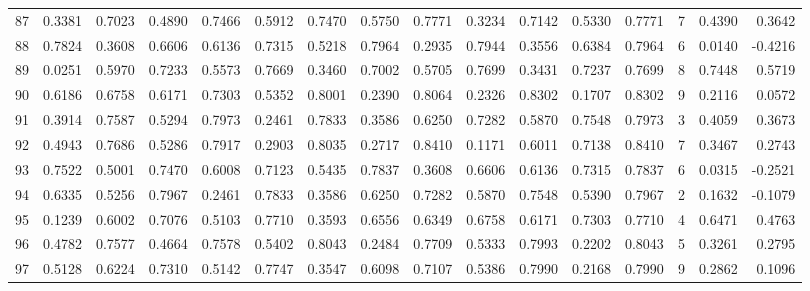 \begin{tabular}{lrrrrrrrrrrrrrrr}
87  &      0.3381 &  0.7023 &  0.4890 &  0.7466 &  0.5912 &  0.7470 &  0.5750 &  0.7771 &  0.3234 &  0.7142 &   0.5330 &     0.7771 &      7 &                    0.4390 &                     0.3642 \\
88  &      0.7824 &  0.3608 &  0.6606 &  0.6136 &  0.7315 &  0.5218 &  0.7964 &  0.2935 &  0.7944 &  0.3556 &   0.6384 &     0.7964 &      6 &                    0.0140 &                    -0.4216 \\
89  &      0.0251 &  0.5970 &  0.7233 &  0.5573 &  0.7669 &  0.3460 &  0.7002 &  0.5705 &  0.7699 &  0.3431 &   0.7237 &     0.7699 &      8 &                    0.7448 &                     0.5719 \\
90  &      0.6186 &  0.6758 &  0.6171 &  0.7303 &  0.5352 &  0.8001 &  0.2390 &  0.8064 &  0.2326 &  0.8302 &   0.1707 &     0.8302 &      9 &                    0.2116 &                     0.0572 \\
91  &      0.3914 &  0.7587 &  0.5294 &  0.7973 &  0.2461 &  0.7833 &  0.3586 &  0.6250 &  0.7282 &  0.5870 &   0.7548 &     0.7973 &      3 &                    0.4059 &                     0.3673 \\
92  &      0.4943 &  0.7686 &  0.5286 &  0.7917 &  0.2903 &  0.8035 &  0.2717 &  0.8410 &  0.1171 &  0.6011 &   0.7138 &     0.8410 &      7 &                    0.3467 &                     0.2743 \\
93  &      0.7522 &  0.5001 &  0.7470 &  0.6008 &  0.7123 &  0.5435 &  0.7837 &  0.3608 &  0.6606 &  0.6136 &   0.7315 &     0.7837 &      6 &                    0.0315 &                    -0.2521 \\
94  &      0.6335 &  0.5256 &  0.7967 &  0.2461 &  0.7833 &  0.3586 &  0.6250 &  0.7282 &  0.5870 &  0.7548 &   0.5390 &     0.7967 &      2 &                    0.1632 &                    -0.1079 \\
95  &      0.1239 &  0.6002 &  0.7076 &  0.5103 &  0.7710 &  0.3593 &  0.6556 &  0.6349 &  0.6758 &  0.6171 &   0.7303 &     0.7710 &      4 &                    0.6471 &                     0.4763 \\
96  &      0.4782 &  0.7577 &  0.4664 &  0.7578 &  0.5402 &  0.8043 &  0.2484 &  0.7709 &  0.5333 &  0.7993 &   0.2202 &     0.8043 &      5 &                    0.3261 &                     0.2795 \\
97  &      0.5128 &  0.6224 &  0.7310 &  0.5142 &  0.7747 &  0.3547 &  0.6098 &  0.7107 &  0.5386 &  0.7990 &   0.2168 &     0.7990 &      9 &                    0.2862 &                     0.1096 \\

\end{tabular}
